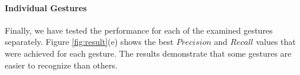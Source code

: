 \paragraph{Individual Gestures}

Finally, we have tested the performance for each of the examined gestures separately.
Figure \ref{fig:result}(e) shows the best $Precision$ and $Recall$ values that were achieved for each gesture.
The results demonstrate that some gestures are easier to recognize than others.
